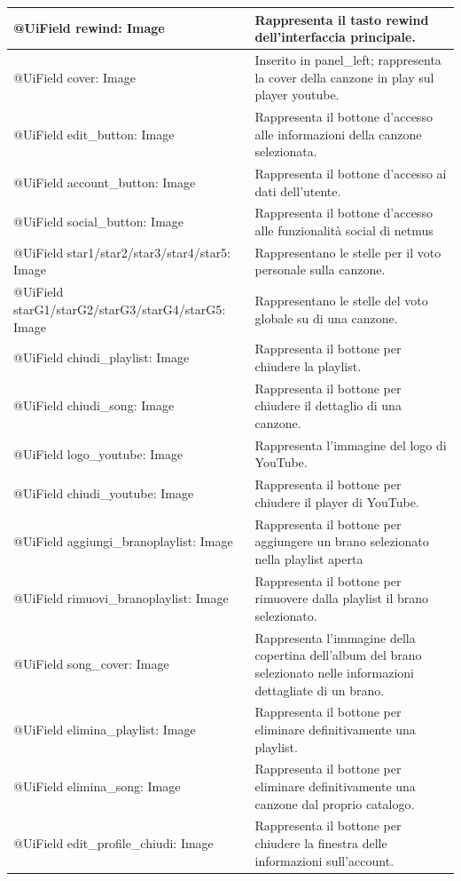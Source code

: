\begin{longtable}{|p{}|p{}|}
@UiField rewind: Image & Rappresenta il tasto rewind dell'interfaccia
principale.\\\hline
@UiField cover: Image & Inserito in panel\_left; rappresenta la cover della
canzone in play sul player youtube.\\\hline
@UiField edit\_button: Image & Rappresenta il bottone d'accesso alle
informazioni della canzone selezionata.\\\hline
@UiField account\_button: Image & Rappresenta il bottone d'accesso ai
dati dell'utente.\\\hline
@UiField social\_button: Image & Rappresenta il bottone d'accesso alle
funzionalit\`a social di netmus\\\hline
@UiField star1/star2/star3/star4/star5: Image & Rappresentano le stelle
per il voto personale sulla canzone.\\\hline
@UiField starG1/starG2/starG3/starG4/starG5: Image & Rappresentano le
stelle del voto globale su di una canzone.\\\hline
@UiField chiudi\_playlist: Image & Rappresenta il bottone per chiudere la
playlist.\\\hline @UiField chiudi\_song: Image & Rappresenta il bottone
per chiudere il dettaglio di una canzone.\\\hline
@UiField logo\_youtube: Image & Rappresenta l'immagine del logo di
YouTube.\\\hline
@UiField chiudi\_youtube: Image & Rappresenta il bottone per chiudere il
player di YouTube.\\\hline
@UiField aggiungi\_branoplaylist: Image & Rappresenta il bottone per
aggiungere un brano selezionato nella playlist aperta\\\hline
@UiField rimuovi\_branoplaylist: Image & Rappresenta il bottone per
rimuovere dalla playlist il brano selezionato.\\\hline
@UiField song\_cover: Image & Rappresenta l'immagine della copertina
dell'album del brano selezionato nelle informazioni dettagliate di un
brano.\\\hline
@UiField elimina\_playlist: Image & Rappresenta il bottone per eliminare
definitivamente una playlist.\\\hline
@UiField elimina\_song: Image & Rappresenta il bottone per eliminare
definitivamente una canzone dal proprio catalogo. \\\hline
@UiField edit\_profile\_chiudi: Image & Rappresenta il bottone per
chiudere la finestra delle informazioni sull'account.\\\hline

\end{longtable}
